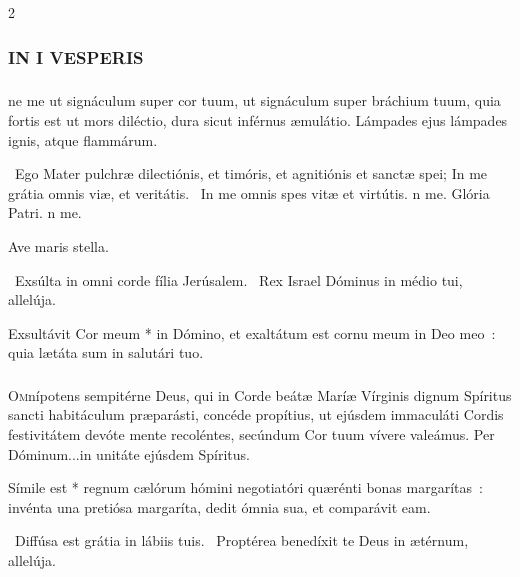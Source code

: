 \documentclass[9pt,twoside]{extarticle}
\begin{document}
\begin{multicols}{2}

{\small {}}

\subsubsection*{\center \normalfont \textsc{IN I VESPERIS}}

\subsubsection*{\normalfont {}}
ne me ut signáculum super cor tuum, ut signáculum super bráchium tuum, quia fortis est ut mors diléctio, dura sicut inférnus æmulátio. Lámpades ejus lámpades ignis, atque flammárum.

\smallskip
{}~Ego Mater pulchræ dilectiónis, et timóris, et agnitiónis et sanctæ spei; \textred{*} In me grátia omnis viæ, et veritátis. ~In me omnis spes vitæ et virtútis. n me. Glória Patri. n me.

 Ave maris stella. 

~Exsúlta in omni corde fília Jerúsalem. ~Rex Israel Dóminus in médio tui, allelúja.

 Exsultávit Cor meum * in Dómino, et exaltátum est cornu meum in Deo meo~: quia lætáta sum in salutári tuo.

\subsubsection*{\center \normalfont {}}
\lettrine{O}{m}nípotens sempitérne Deus, qui in Corde beátæ Maríæ Vírginis dignum Spíritus sancti habitáculum præparásti, concéde propítius, ut ejúsdem immaculáti Cordis festivitátem devóte mente recoléntes, secúndum Cor tuum vívere valeámus. Per Dóminum...in unitáte ejúsdem Spíritus.

\small
{} \normalsize

 Símile est * regnum cælórum hómini negotiatóri quærénti bonas margarítas~: invénta una pretiósa margaríta, dedit ómnia sua, et comparávit eam.

~Diffúsa est grátia in lábiis tuis. ~Proptérea benedíxit te Deus in ætérnum, allelúja.


\end{multicols}
\end{document}
